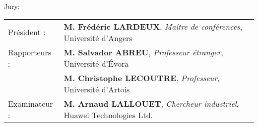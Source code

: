 \begin{titlepage}
\begin{center}
\end{center}
\end{titlepage}
\restoregeometry
\sloppy\pagebreak


\begin{vcentrepage}
{ \begin{center}\Large {\sc Jury}:  \end{center}}
\vspace{1em}

\begin{tabular}{ll}
Président : & \textbf{M. Frédéric LARDEUX}, \textit{Maître de conférences}, Université d'Angers \\
Rapporteurs : & \textbf{M. Salvador ABREU}, \textit{Professeur étranger}, Université d'Évora \\
& \textbf{M. Christophe LECOUTRE}, \textit{Professeur}, Université d'Artois \\
Examinateur : & \textbf{M. Arnaud LALLOUET}, \textit{Chercheur industriel}, Huawei Technologies Ltd. \\
\end{tabular}

\pagestyle{plain}


\end{vcentrepage}
